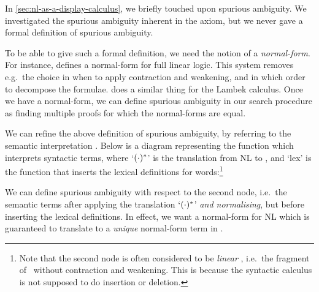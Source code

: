 In \autoref{sec:nl-as-a-display-calculus}, we briefly touched upon
spurious ambiguity. We investigated the spurious ambiguity inherent in
the axiom, but we never gave a formal definition of spurious
ambiguity.

To be able to give such a formal definition, we need the notion of a
\emph{normal-form}. For instance, \citet{andreoli1992} defines a
normal-form for full linear logic. This system removes e.g.\ the
choice in when to apply contraction and weakening, and in which order
to decompose the formulae. \citet{hepple1990} does a similar thing for
the Lambek calculus. Once we have a normal-form, we can define
spurious ambiguity in our search procedure as finding multiple proofs
for which the normal-forms are equal.

We can refine the above definition of spurious ambiguity, by referring
to the semantic interpretation \citep{capelletti2007,bastenhof2013}.
Below is a diagram representing the function which interprets
syntactic terms, where `$({\cdot})^*$' is the translation from NL to \lamET,
and `lex' is the function that inserts the lexical definitions for
words:\footnote{%
  Note that the second node is often considered to be \emph{linear}
  \lamET, i.e.\ the fragment of \lamET\ without contraction and
  weakening. This is because the syntactic calculus is not supposed
  to do insertion or deletion. 
}
\begin{center}
\end{center}
We can define spurious ambiguity with respect to the second node,
i.e.\ the semantic terms after applying the translation `$({\cdot})^*$'
\emph{and normalising}, but before inserting the lexical definitions.
In effect, we want a normal-form for NL which is guaranteed to
translate to a \emph{unique} normal-form term in \lamET.


